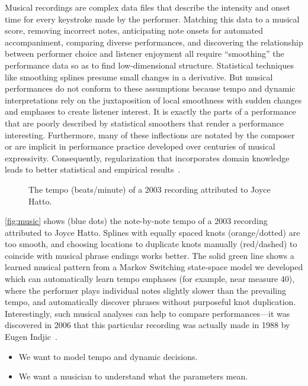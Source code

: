 \documentclass[12pt]{article}
\begin{document}
Musical recordings are complex data files that describe the intensity and onset time
for every keystroke made by the performer. Matching this data to a
musical score, removing incorrect notes, anticipating note onsets for
automated accompaniment, comparing diverse performances, and
discovering the relationship between performer choice and listener
enjoyment all require ``smoothing'' the performance data so as to find
low-dimensional structure. Statistical
techniques like smoothing splines presume small changes in a
derivative. 
But musical performances do not conform to these assumptions because tempo and
dynamic interpretations rely on the juxtaposition of local smoothness
with sudden changes and emphases to create listener interest. It is
exactly the parts of a performance that are poorly described by
statistical smoothers that render a performance
interesting. Furthermore, many of these inflections are notated by the
composer or are implicit in performance practice developed over
centuries of musical expressivity. Consequently, regularization that
incorporates domain knowledge leads to better statistical and
empirical results~\citep{McDonald2016}. 

\begin{figure}
  \centering
  \caption{The tempo (beats/minute) of a 2003 recording attributed to Joyce
    Hatto.}
  \label{fig:music}
\end{figure}
\autoref{fig:music}
shows (blue dots) the note-by-note tempo of a 2003 recording
attributed to Joyce Hatto. Splines with
equally spaced knots (orange/dotted) are too smooth, and choosing locations
to duplicate knots manually (red/dashed)
to coincide with musical phrase endings works better. The solid green line 
shows a learned musical pattern from a Markov Switching
state-space model we developed which can
automatically learn tempo emphases (for example, near measure 40),
where the performer plays individual notes slightly slower than the
prevailing tempo, and automatically discover phrases
without purposeful knot 
duplication. Interestingly, such musical analyses can help to compare
performances---it was discovered in 2006 that this
particular recording was actually made in 1988 by Eugen
Indjic~\citep{CookSapp2009}. 


\begin{itemize}
\item We want to model tempo and dynamic decisions.
\item We want a musician to understand what the parameters mean.
\end{itemize}
\end{document}
